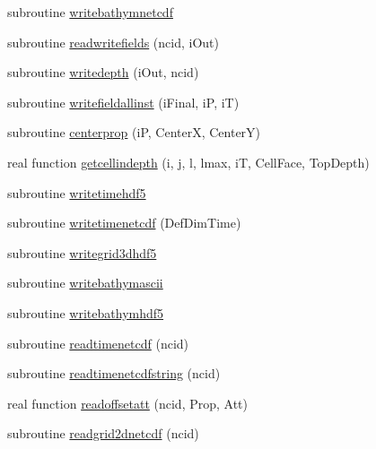 \begin{DoxyCompactItemize}
\item 
subroutine \mbox{\hyperlink{namespacemodulenetcdfcf__2__hdf5mohid_a47fc9c2f9553c656c2bee0e119f10b27}{writebathymnetcdf}}
\item 
subroutine \mbox{\hyperlink{namespacemodulenetcdfcf__2__hdf5mohid_aebb4610701d55eaa0ab3294968f44ff9}{readwritefields}} (ncid, i\+Out)
\item 
subroutine \mbox{\hyperlink{namespacemodulenetcdfcf__2__hdf5mohid_abb91469d951de000f7fa64d1cb05d626}{writedepth}} (i\+Out, ncid)
\item 
subroutine \mbox{\hyperlink{namespacemodulenetcdfcf__2__hdf5mohid_af0d01522f1a028b5bded5653f028f1de}{writefieldallinst}} (i\+Final, iP, iT)
\item 
subroutine \mbox{\hyperlink{namespacemodulenetcdfcf__2__hdf5mohid_a8712e5cb09686b66d3aa9f8e05e3bd82}{centerprop}} (iP, CenterX, CenterY)
\item 
real function \mbox{\hyperlink{namespacemodulenetcdfcf__2__hdf5mohid_ac801b4c359021fc9e8880497aa5fc5d6}{getcellindepth}} (i, j, l, lmax, iT, Cell\+Face, Top\+Depth)
\item 
subroutine \mbox{\hyperlink{namespacemodulenetcdfcf__2__hdf5mohid_ac7924022182350a5df92f593c9dd7c76}{writetimehdf5}}
\item 
subroutine \mbox{\hyperlink{namespacemodulenetcdfcf__2__hdf5mohid_a4a79edecc3020a71ece2ef3223da1024}{writetimenetcdf}} (Def\+Dim\+Time)
\item 
subroutine \mbox{\hyperlink{namespacemodulenetcdfcf__2__hdf5mohid_ab6beeef80ab10e31564937dcd13306eb}{writegrid3dhdf5}}
\item 
subroutine \mbox{\hyperlink{namespacemodulenetcdfcf__2__hdf5mohid_a0b860e380cd54020433bfe0ed0f27126}{writebathymascii}}
\item 
subroutine \mbox{\hyperlink{namespacemodulenetcdfcf__2__hdf5mohid_aaf89f5e8bf98ca1365b3c0074c36f8ba}{writebathymhdf5}}
\item 
subroutine \mbox{\hyperlink{namespacemodulenetcdfcf__2__hdf5mohid_a734d453ab8aa9e07adc4f367336f1875}{readtimenetcdf}} (ncid)
\item 
subroutine \mbox{\hyperlink{namespacemodulenetcdfcf__2__hdf5mohid_a3208523531a4e193ad1b485436dad44a}{readtimenetcdfstring}} (ncid)
\item 
real function \mbox{\hyperlink{namespacemodulenetcdfcf__2__hdf5mohid_a8d090e0ec216dae90d409d416fd150dd}{readoffsetatt}} (ncid, Prop, Att)
\item 
subroutine \mbox{\hyperlink{namespacemodulenetcdfcf__2__hdf5mohid_a551caefae44a438a2446fd263b4b51e7}{readgrid2dnetcdf}} (ncid)

\end{DoxyCompactItemize}
